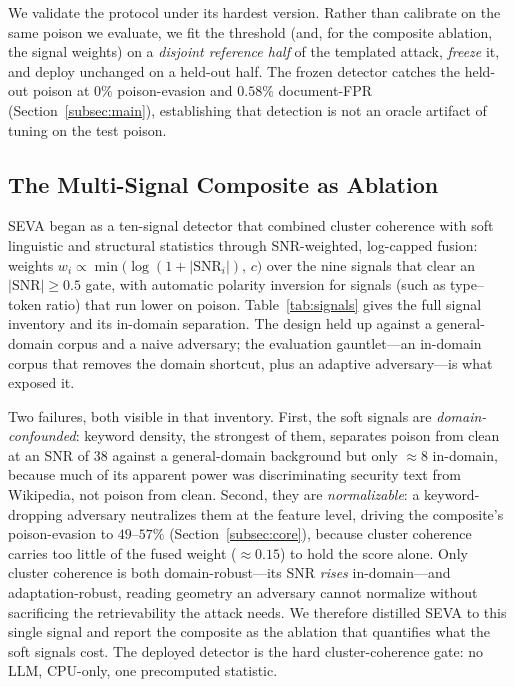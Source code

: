 \documentclass[10pt,journal,compsoc]{IEEEtran}
\begin{document}
We validate the protocol under its hardest version. Rather than calibrate on the
same poison we evaluate, we fit the threshold (and, for the composite ablation, the
signal weights) on a \emph{disjoint reference half} of the templated attack,
\emph{freeze} it, and deploy unchanged on a held-out half. The frozen detector
catches the held-out poison at $0\%$ poison-evasion and $0.58\%$ document-FPR
(Section~\ref{subsec:main}), establishing that detection is not an oracle artifact
of tuning on the test poison.

\subsection{The Multi-Signal Composite as Ablation}
SEVA began as a ten-signal detector that combined cluster coherence with soft
linguistic and structural statistics through SNR-weighted, log-capped fusion:
weights $w_i \propto \min\!\big(\log(1+|\mathrm{SNR}_i|),\,c\big)$ over the nine
signals that clear an $|\mathrm{SNR}|\geq0.5$ gate, with automatic polarity
inversion for signals (such as type--token ratio) that run lower on poison.
Table~\ref{tab:signals} gives the full signal inventory and its in-domain separation. The
design held up against a general-domain corpus and a naive adversary; the
evaluation gauntlet---an in-domain corpus that removes the domain shortcut, plus an
adaptive adversary---is what exposed it.

Two failures, both visible in that inventory. First, the soft signals are
\emph{domain-confounded}: keyword density, the strongest of them, separates poison
from clean at an SNR of $38$ against a general-domain background but only
$\approx\!8$ in-domain, because much of its apparent power was discriminating
security text from Wikipedia, not poison from clean.
Second, they are \emph{normalizable}: a keyword-dropping adversary neutralizes them
at the feature level, driving the composite's poison-evasion to $49$--$57\%$
(Section~\ref{subsec:core}), because cluster coherence carries too little of the
fused weight ($\approx\!0.15$) to hold the score alone.
Only cluster coherence is both domain-robust---its SNR \emph{rises} in-domain---and
adaptation-robust, reading geometry an adversary cannot normalize without
sacrificing the retrievability the attack needs. We therefore distilled SEVA to
this single signal and report the composite as the ablation that quantifies what
the soft signals cost. The deployed detector is the hard cluster-coherence gate: no
LLM, CPU-only, one precomputed statistic.
\end{document}
